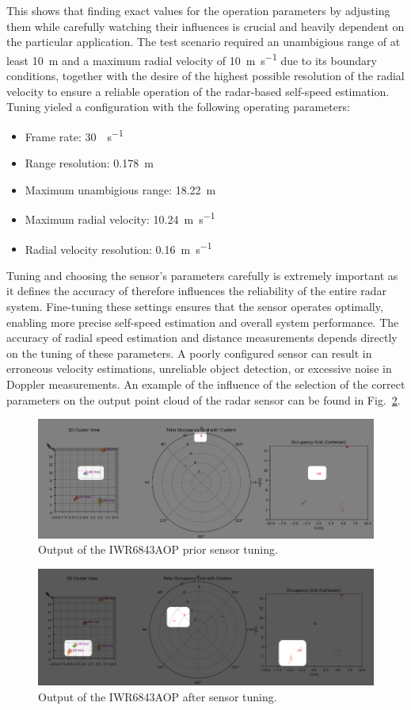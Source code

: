 This shows that finding exact values for the operation parameters by adjusting them while carefully watching their influences is crucial and heavily dependent on the particular application.
The test scenario required an unambigious range of at least \SI{10}{\meter} and a maximum radial velocity of \SI{10}{\meter\per\second} due to its boundary conditions, together with the desire of the highest possible resolution of the radial velocity to ensure a reliable operation of the radar-based self-speed estimation.
Tuning yieled a configuration with the following operating parameters:
\begin{itemize}
    \item Frame rate: \SI{30}{\frame\per\second}
    \item Range resolution: \SI{0.178}{\meter}
    \item Maximum unambigious range: \SI{18.22}{\meter}
    \item Maximum radial velocity: \SI{10.24}{\meter\per\second}
    \item Radial velocity resolution: \SI{0.16}{\meter\per\second}
\end{itemize}

Tuning and choosing the sensor's parameters carefully is extremely important as it defines the accuracy of 
therefore influences the reliability of the entire radar system.
Fine-tuning these settings ensures that the sensor operates optimally, enabling more precise self-speed estimation and overall system performance.
The accuracy of radial speed estimation and distance measurements depends directly on the tuning of these parameters. A poorly configured sensor can result in erroneous velocity estimations, unreliable object detection, or excessive noise in Doppler measurements. An example of the influence of the selection of the correct parameters on the output point cloud of the radar sensor can be found in Fig.~\ref{fig:IWR6843AOP Calibration example2 for the sensor}.

\begin{figure}[!htbp]
    \centering
    \includegraphics[width=1.0\linewidth]{images/calib_ex.png}
    \caption{Output of the IWR6843AOP prior sensor tuning.}
    \label{fig:IWR6843AOP Calibration example for the sensor}
\end{figure}

\begin{figure}[!htbp]
    \centering
    \includegraphics[width=1.0\linewidth]{images/calib_ex2.png}
    \caption{Output of the IWR6843AOP after sensor tuning.}
    \label{fig:IWR6843AOP Calibration example2 for the sensor}
\end{figure}
\FloatBarrier